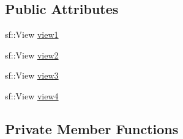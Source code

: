 \subsection*{Public Attributes}
\begin{DoxyCompactItemize}
\item 
sf\+::\+View \hyperlink{classleveleditor_a8a6367bede4a3a13c41f764f1ac628a4}{view1}
\item 
sf\+::\+View \hyperlink{classleveleditor_aa6730359d22f4ea8f82347e29af75afa}{view2}
\item 
sf\+::\+View \hyperlink{classleveleditor_a2051eecaa725f921ef9520030c713a0b}{view3}
\item 
sf\+::\+View \hyperlink{classleveleditor_a73061ee47d22e443922a460cb97d2ed3}{view4}
\end{DoxyCompactItemize}
\subsection*{Private Member Functions}
